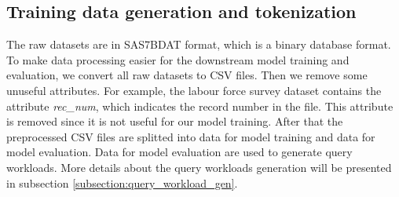 \documentclass[conference]{IEEEtran}
\begin{document}
\subsection{Training data generation and tokenization}
\label{subsection:training_data_gen}
The raw datasets are in SAS7BDAT format, which is a binary database format. To make data processing easier for the downstream model training and evaluation, we convert all raw datasets to CSV files. Then we remove some unuseful attributes. For example, the labour force survey dataset contains the attribute \emph{rec\_num}, which indicates the record number in the file. This attribute is removed since it is not useful for our model training. After that the preprocessed CSV files are splitted into data for model training and data for model evaluation. Data for model evaluation are used to generate query workloads. More details about the query workloads generation will be presented in subsection \ref{subsection:query_workload_gen}.
\end{document}
